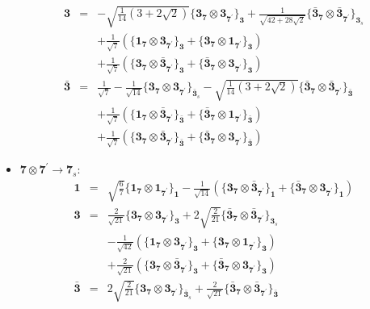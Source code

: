 \documentclass[english]{article}
\newcommand{\subcg}[3]{\big\{ {#1}\otimes{#2}\big\}^{}_{#3}}
\newcommand{\rep}[1]{\mathbf{#1}}
\begin{document}
\begin{itemize}
\begin{eqnarray*}
\rep{3} &=& -\sqrt{\frac{1}{14} \left(3+2 \sqrt{2}\right)}\subcg{\rep{3}_{\rep{7}}}{\rep{3}_{\rep{7^{\prime}}}}{\rep{3}}+\frac{1}{\sqrt{42+28 \sqrt{2}}}\subcg{\rep{\bar{3}}_{\rep{7}}}{\rep{\bar{3}}_{\rep{7^{\prime}}}}{\rep{3}_{s}} \\ 
 & & +\frac{1}{\sqrt{7}}\left(\subcg{\rep{1}_{\rep{7}}}{\rep{3}_{\rep{7^{\prime}}}}{\rep{3}}+\subcg{\rep{3}_{\rep{7}}}{\rep{1}_{\rep{7^{\prime}}}}{\rep{3}}\right) \\ 
 & & +\frac{1}{\sqrt{7}}\left(\subcg{\rep{3}_{\rep{7}}}{\rep{\bar{3}}_{\rep{7^{\prime}}}}{\rep{3}}+\subcg{\rep{\bar{3}}_{\rep{7}}}{\rep{3}_{\rep{7^{\prime}}}}{\rep{3}}\right)
\\
\rep{\bar{3}} &=& \frac{1}{\sqrt{7}}-\frac{1}{\sqrt{14}}\subcg{\rep{3}_{\rep{7}}}{\rep{3}_{\rep{7^{\prime}}}}{\rep{\bar{3}}_{s}}-\sqrt{\frac{1}{14} \left(3+2 \sqrt{2}\right)}\subcg{\rep{\bar{3}}_{\rep{7}}}{\rep{\bar{3}}_{\rep{7^{\prime}}}}{\rep{\bar{3}}} \\ 
 & & +\frac{1}{\sqrt{7}}\left(\subcg{\rep{1}_{\rep{7}}}{\rep{\bar{3}}_{\rep{7^{\prime}}}}{\rep{\bar{3}}}+\subcg{\rep{\bar{3}}_{\rep{7}}}{\rep{1}_{\rep{7^{\prime}}}}{\rep{\bar{3}}}\right) \\ 
 & & +\frac{1}{\sqrt{7}}\left(\subcg{\rep{3}_{\rep{7}}}{\rep{\bar{3}}_{\rep{7^{\prime}}}}{\rep{\bar{3}}}+\subcg{\rep{\bar{3}}_{\rep{7}}}{\rep{3}_{\rep{7^{\prime}}}}{\rep{\bar{3}}}\right)
\end{eqnarray*}
\item $\rep{7}\otimes\rep{7^{\prime}}\to\rep{7}_{s}$:
\begin{eqnarray*}
\rep{1} &=& \sqrt{\frac{6}{7}}\subcg{\rep{1}_{\rep{7}}}{\rep{1}_{\rep{7^{\prime}}}}{\rep{1}}-\frac{1}{\sqrt{14}}\left(\subcg{\rep{3}_{\rep{7}}}{\rep{\bar{3}}_{\rep{7^{\prime}}}}{\rep{1}}+\subcg{\rep{\bar{3}}_{\rep{7}}}{\rep{3}_{\rep{7^{\prime}}}}{\rep{1}}\right)
\\
\rep{3} &=& \frac{2}{\sqrt{21}}\subcg{\rep{3}_{\rep{7}}}{\rep{3}_{\rep{7^{\prime}}}}{\rep{3}}+2 \sqrt{\frac{2}{21}}\subcg{\rep{\bar{3}}_{\rep{7}}}{\rep{\bar{3}}_{\rep{7^{\prime}}}}{\rep{3}_{s}} \\ 
 & & -\frac{1}{\sqrt{42}}\left(\subcg{\rep{1}_{\rep{7}}}{\rep{3}_{\rep{7^{\prime}}}}{\rep{3}}+\subcg{\rep{3}_{\rep{7}}}{\rep{1}_{\rep{7^{\prime}}}}{\rep{3}}\right) \\ 
 & & +\frac{2}{\sqrt{21}}\left(\subcg{\rep{3}_{\rep{7}}}{\rep{\bar{3}}_{\rep{7^{\prime}}}}{\rep{3}}+\subcg{\rep{\bar{3}}_{\rep{7}}}{\rep{3}_{\rep{7^{\prime}}}}{\rep{3}}\right)
\\
\rep{\bar{3}} &=& 2 \sqrt{\frac{2}{21}}\subcg{\rep{3}_{\rep{7}}}{\rep{3}_{\rep{7^{\prime}}}}{\rep{\bar{3}}_{s}}+\frac{2}{\sqrt{21}}\subcg{\rep{\bar{3}}_{\rep{7}}}{\rep{\bar{3}}_{\rep{7^{\prime}}}}{\rep{\bar{3}}} \\ 

\end{eqnarray*}
\end{itemize}
\end{document}

